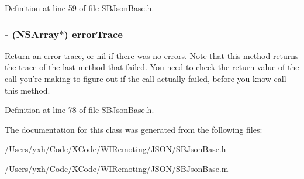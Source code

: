 Definition at line 59 of file SBJsonBase.h.\hypertarget{interface_s_b_json_base_aa83f0ee5efade2fd26ddf6591ffd8dc0}{
\subsubsection[{errorTrace}]{\setlength{\rightskip}{0pt plus 5cm}-\/ (NSArray$\ast$) errorTrace}}
\label{interface_s_b_json_base_aa83f0ee5efade2fd26ddf6591ffd8dc0}


Return an error trace, or nil if there was no errors. Note that this method returns the trace of the last method that failed. You need to check the return value of the call you're making to figure out if the call actually failed, before you know call this method. 

Definition at line 78 of file SBJsonBase.h.

The documentation for this class was generated from the following files:\begin{DoxyCompactItemize}
\item 
/Users/yxh/Code/XCode/WIRemoting/JSON/SBJsonBase.h\item 
/Users/yxh/Code/XCode/WIRemoting/JSON/SBJsonBase.m\end{DoxyCompactItemize}
